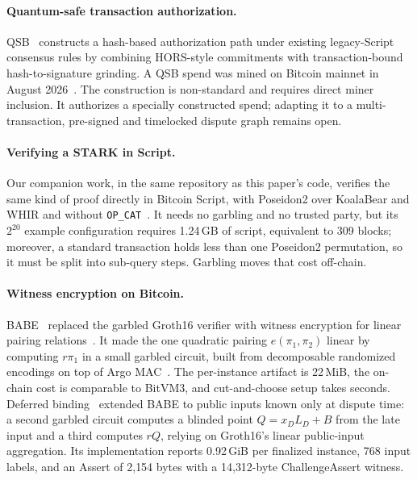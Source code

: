\documentclass[11pt]{article}
\begin{document}
\paragraph{Quantum-safe transaction authorization.}
QSB~\cite{levy26qsb} constructs a hash-based authorization path under existing
legacy-Script consensus rules by combining HORS-style commitments with
transaction-bound hash-to-signature grinding. A QSB spend was mined on Bitcoin
mainnet in August 2026~\cite{starkware26qsb}. The construction is non-standard
and requires direct miner inclusion. It authorizes a specially constructed
spend; adapting it to a multi-transaction, pre-signed and timelocked dispute
graph remains open.

\paragraph{Verifying a STARK in Script.} Our companion work, in the same
repository as this paper's code, verifies the same kind of proof directly in
Bitcoin Script, with Poseidon2 over KoalaBear and WHIR and without
\texttt{OP\_CAT}~\cite{goatscriptverifier}. It needs no garbling and no
trusted party, but its $2^{20}$ example configuration requires 1.24\,GB of
script, equivalent to 309 blocks; moreover, a standard transaction holds less
than one Poseidon2 permutation, so it must be split into sub-query steps.
Garbling moves that cost off-chain.

\paragraph{Witness encryption on Bitcoin.} BABE~\cite{babe2026} replaced the
garbled Groth16 verifier with witness encryption for linear pairing
relations~\cite{gkpw24}. It made the one quadratic pairing $e(\pi_1,\pi_2)$ linear
by computing $r\pi_1$ in a small garbled circuit, built from decomposable
randomized encodings on top of Argo MAC~\cite{el26argo}. The per-instance artifact
is 22\,MiB, the on-chain cost is comparable to BitVM3, and cut-and-choose setup
takes seconds. Deferred binding~\cite{goatpbwe} extended BABE to public inputs
known only at dispute time: a second garbled circuit computes a blinded point
$Q=x_D L_D+B$ from the late input and a third computes $rQ$, relying on
Groth16's linear public-input aggregation. Its implementation reports 0.92\,GiB
per finalized instance, 768 input labels, and an Assert of 2{,}154 bytes with a
14{,}312-byte ChallengeAssert witness.
\end{document}
